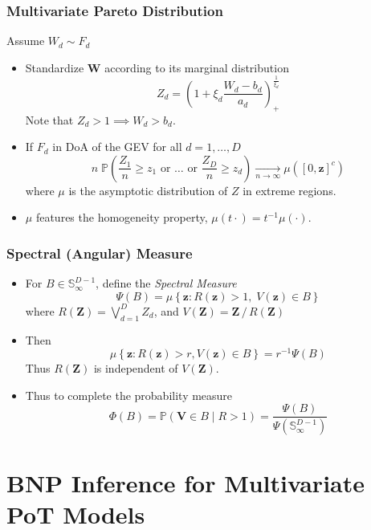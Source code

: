 \documentclass[aspectratio=169,10pt,notes]{beamer}
\begin{document}
\begin{frame}
    \frametitle{Multivariate Pareto Distribution}
    \cite{ferreira2014}
    
    Assume $W_d \sim F_d$
    \begin{itemize}
    \item Standardize $\bm{W}$ according to its marginal distribution
    \[
        Z_d = \left(1 + \xi_d\frac{W_d - b_d}{a_d}\right)_+^{\frac{1}{\xi_d}}
    \]
        Note that $Z_d > 1 \implies W_d > b_d$.
    \item If $F_d$ in DoA of the GEV for all $d = 1,\ldots,D$
    \[
    n\;\mathbb{P}\left(
        \frac{Z_1}{n} \geq z_1 \text{ or }\ldots\text{ or }\frac{Z_D}{n} \geq z_d
        \right) \xrightarrow[n\to\infty]{} \mu\left([0,\bm{z}]^c\right)
    \]
    where $\mu$ is the asymptotic distribution of $Z$ in extreme regions.
    \item $\mu$ features the homogeneity property, $\mu(t\cdot) = t^{-1}\mu(\cdot)$.
    \end{itemize}
\end{frame} %



\begin{frame}
    \frametitle{Spectral (Angular) Measure}
    \begin{itemize}
    \item For $B \in \mathbb{S}_{\infty}^{D-1}$, define the \emph{Spectral Measure}
    \[
        \Psi(B) = \mu\left\lbrace \bm{z} : R(\bm{z}) > 1,\;V(\bm{z}) \in B\right\rbrace
    \]
    where $R(\bm{Z}) = \bigvee_{d = 1}^D Z_d$,  and $V(\bm{Z}) = \bm{Z}\,/\,R(\bm{Z})$
    \item Then
    \[
        \mu\left\lbrace\bm{z} : R(\bm{z}) > r, V(\bm{z}) \in B\right\rbrace = r^{-1}\Psi(B)    
    \]
    Thus $R(\bm{Z})$ is independent of $V(\bm{Z})$.
    \item Thus to complete the probability measure
    \[
        \Phi(B) = \mathbb{P}\left(\bm{V} \in B \mid R > 1\right) = 
            \frac{\Psi(B)}{\Psi\left(\mathbb{S}_{\infty}^{D-1}\right)}
    \]
    \end{itemize}
\end{frame} %


\section[Multivariate PoT]{BNP Inference for Multivariate PoT Models}
\end{document}
